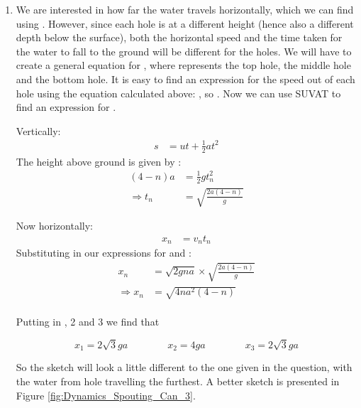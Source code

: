 \begin{problem}
{\begin{enumerate}
\item We are interested in how far the water travels horizontally, which we can find using \value{distance}{speed \times time}{}. However, since each hole is at a different height (hence also a different depth below the surface), both the horizontal speed and the time taken for the water to fall to the ground will be different for the holes. We will have to create a general equation for , where \value{n}{1}{} represents the top hole, \value{n}{2}{} the middle hole and \value{n}{3}{} the bottom hole. It is easy to find an expression for the speed out of each hole  using the equation calculated above: \value{h}{na}{}, so . Now we can use SUVAT to find an expression for .

Vertically:
\begin{eqnarray*}
 s&= ut + \frac{1}{2}at^{2}
\end{eqnarray*} 
The height above ground is given by :
\begin{eqnarray*}
\left(4-n\right)a&= \frac{1}{2}gt_{n}^{2} \\ 
\Rightarrow t_{n}&= \sqrt{\frac{2a\left(4-n\right)}{g}}
\end{eqnarray*}

Now horizontally:
\begin{eqnarray*} 
x_{n}&= v_{n}t_{n}
\end{eqnarray*}  
Substituting in our expressions for  and :
\begin{eqnarray*}
 x_{n}&= \sqrt{2gna}\times\sqrt{\frac{2a\left(4-n\right)}{g}} \\ 
\Rightarrow x_{n}&= \sqrt{4na^2\left(4-n\right)} \\ 
\end{eqnarray*}

Putting in \value{n}{1}{}, 2 and 3 we find that

\begin{equation*}
x_1 = 2\sqrt{3}ga \quad\quad\quad\quad x_2 = 4ga \quad\quad\quad\quad x_3 = 2\sqrt{3}ga
\end{equation*}

So the sketch will look a little different to the one given in the question, with the water from hole  travelling the furthest. A better sketch is presented in Figure \ref{fig:Dynamics_Spouting_Can_3}.


\end{enumerate}}
\end{problem}
